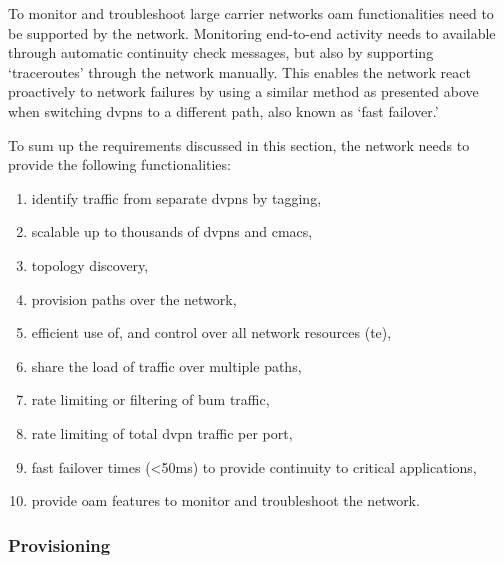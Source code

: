 To monitor and troubleshoot large carrier networks \ac{oam} functionalities need to be supported by the network. Monitoring end-to-end activity needs to available through automatic continuity check messages, but also by supporting `traceroutes' through the network manually. This enables the network react proactively to network failures by using a similar method as presented above when switching \acp{dvpn} to a different path, also known as `fast failover.'

To sum up the requirements discussed in this section, the network needs to provide the following functionalities:

\begin{enumerate}
	\item identify traffic from separate \acp{dvpn} by tagging, 
	\item scalable up to thousands of \acp{dvpn} and \acsp{cmac},
	\item topology discovery, 
	\item provision paths over the network,
	\item efficient use of, and control over all network resources (\ac{te}),
	\item share the load of traffic over multiple paths,
	\item rate limiting or filtering of \ac{bum} traffic,
	\item rate limiting of total \ac{dvpn} traffic per port,
	\item fast failover times (<50ms) to provide continuity to critical applications,
	\item provide \acl{oam} features to monitor and troubleshoot the network.
\end{enumerate}



\subsubsection{Provisioning} %
\label{ssub:provisioning}



